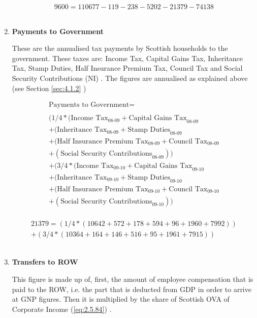 \begin{enumerate}
\begin{equation} \nonumber
9600 = 110677-119-238-5202-21379-74138
\end{equation}\\


\item \textbf {Payments to Government}

These are the annualised tax payments by Scottish households to the government. These taxes are: Income Tax, Capital Gains Tax, Inheritance Tax, Stamp Duties, Half Insurance Premium Tax, Council Tax and Social Security Contributions (NI) \cite{ScotGov2013b}. The figures are annualised as explained above (see Section \ref{sec:4.1.2} )

\begin{equation}
\begin{split}
\text{Payments to Government} =  \\ \\
(1/4*(\text{Income Tax}_\text{08-09}+\text{Capital Gains Tax}_\text{08-09}\\
+(\text{Inheritance Tax}_\text{08-09}+\text{Stamp Duties}_\text{08-09}\\
+(\text{Half Insurance Premium Tax}_\text{08-09}+\text{Council Tax}_\text{08-09}\\
+(\text{Social Security Contributions}_\text{08-09}))\\
+(3/4*(\text{Income Tax}_\text{09-10}+\text{Capital Gains Tax}_\text{09-10}\\
+(\text{Inheritance Tax}_\text{09-10}+\text{Stamp Duties}_\text{09-10}\\
+(\text{Half Insurance Premium Tax}_\text{09-10}+\text{Council Tax}_\text{09-10}\\
+(\text{Social Security Contributions}_\text{09-10}))\\
\end{split} \label{eq:2.5.17}
\end{equation}

\begin{equation} \nonumber
\begin{split}
21379=(1/4*(10642+572+178+594+96+1960+7992))\\
+(3/4*(10364+164+146+516+95+1961+7915))
\end{split}
\end{equation}\\


\item \textbf {Transfers to ROW}

This figure is made up of, first, the amount of employee compensation that is paid to the ROW, i.e. the part that is deducted from GDP in order to arrive at GNP figures. Then it is multiplied by the share of Scottish OVA of Corporate Income (\ref{eq:2.5.84}) \cite{ONS2011c}.


\end{enumerate}
